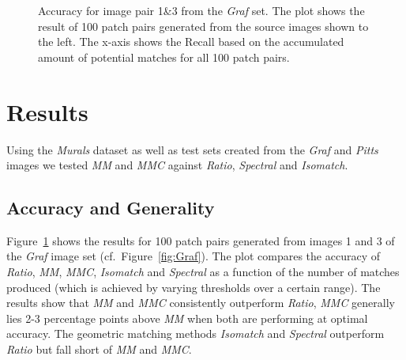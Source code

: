 \begin{figure}[t]
\begin{subfigure}[c]{0.76\textwidth}
	\end{subfigure}%
	\caption{Accuracy for image pair 1\&3 from the \emph{Graf} set. The 
	plot shows the result of 100 patch pairs generated from the source 
	images shown to the left. The x-axis shows the Recall based on the 
accumulated amount of potential matches for all 100 patch pairs. }
	\label{fig:result_graf}
\end{figure}
%
\section{Results}
\label{S:Results}
%
Using the \emph{Murals} dataset as well as test sets created from the 
\emph{Graf} and \emph{Pitts} images we tested \emph{MM} and \emph{MMC} 
against \emph{Ratio}, \emph{Spectral} and \emph{Isomatch}.
%
\subsection{Accuracy and Generality}
%
Figure~\ref{fig:result_graf} shows the results for 100 patch pairs 
generated from images 1 and 3 of the \emph{Graf} image set 
(cf.~Figure~\ref{fig:Graf}). The plot compares the accuracy of 
\emph{Ratio}, \emph{MM}, \emph{MMC}, \emph{Isomatch} and \emph{Spectral} 
as a function of the number of matches produced (which is achieved by 
varying thresholds over a certain range). The results show that 
\emph{MM} and \emph{MMC} consistently outperform \emph{Ratio}, 
\emph{MMC} generally lies 2-3 percentage points above \emph{MM} when 
both are performing at optimal accuracy.  The geometric matching methods 
\emph{Isomatch} and \emph{Spectral} outperform \emph{Ratio} but fall 
short of \emph{MM} and \emph{MMC}.

